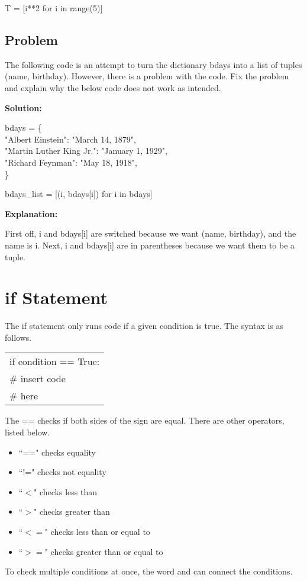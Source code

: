 \documentclass{article}
\newcommand{\define}[1]{\begin{center}\ttfamily #1\end{center}}
\newcommand{\icode}[1]{{\ttfamily #1}}
\newenvironment{code}{\begin{tcolorbox}\ttfamily}{\end{tcolorbox}}
\newenvironment{words}{\begin{tcolorbox}[colback=writing]}{\end{tcolorbox}}
\begin{document}
\define{T = [i**2 for i in range(5)]}

\subsection{Problem}
The following code is an attempt to turn the dictionary \icode{bdays} into a list of tuples \icode{(name, birthday)}. However, there is a problem with the code. Fix the problem and explain why the below code does not work as intended.

\noindent\textbf{Solution:}
\begin{code}
	bdays = \{\\
	\phantom{i}\hspace{2 em}"Albert Einstein": "March 14, 1879",\\
	\phantom{i}\hspace{2 em}"Martin Luther King Jr.": "January 1, 1929",\\
	\phantom{i}\hspace{2 em}"Richard Feynman": "May 18, 1918",\\
	\}
	
	bdays\_list = [(i, bdays[i]) for i in bdays]
\end{code}
\noindent\textbf{Explanation:}
\begin{words}
	First off, \icode{i} and \icode{bdays[i]} are switched because we want \icode{(name, birthday)}, and the name is \icode{i}. Next, \icode{i} and \icode{bdays[i]} are in parentheses because we want them to be a tuple.
\end{words}

\section{\icode{if} Statement}
The \icode{if} statement only runs code if a given condition is true. The syntax is as follows.

\begin{center} \ttfamily
	\begin{tabular}{|l}
		if condition == True:\\
		\hspace{2 em}\# insert code\\
		\hspace{2 em}\# here
	\end{tabular}
\end{center}
The \icode{==} checks if both sides of the sign are equal. There are other operators, listed below.

\begin{multicols}{2}
	\begin{itemize}
		\item ``==" checks equality
		\item ``!=" checks not equality
		\item ``$<$" checks less than
		\item ``$>$" checks greater than
		\item ``$<=$" checks less than or equal to
		\item ``$>=$" checks greater than or equal to
	\end{itemize}
\end{multicols}
\noindent To check multiple conditions at once, the word \icode{and} can connect the conditions.
\end{document}
